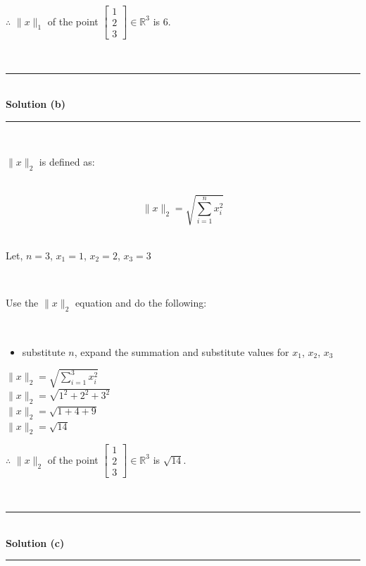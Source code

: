\documentclass{article}
\begin{document}
\parbox{\textwidth}{$\therefore$ $\|x\|_1$ of the point $\begin{bmatrix} 1 \\ 2 \\ 3 \end{bmatrix} \in \mathbb{R}^3$ is $6$.}\\

\noindent\rule{\textwidth}{0.4pt}\\

\textbf{Solution (b)}

\noindent\rule{\textwidth}{0.4pt}\\

\parbox{\textwidth}{$\|x\|_2$ is defined as:}\\

$$\|x\|_2 = \sqrt{\sum_{i=1}^{n} x_i^2}$$\\

\parbox{\textwidth}{Let, $n=3$, $x_1 = 1$, $x_2 = 2$, $x_3 = 3$}\\

\parbox{\textwidth}{Use the $\|x\|_2$ equation and do the following:}\\

\newpage

\begin{itemize}
    \item {substitute $n$, expand the summation and substitute values for $x_1$, $x_2$, $x_3$}
\end{itemize}

$\|x\|_2 = \sqrt{\sum_{i=1}^{3} x_i^2}$\\

$\|x\|_2 = \sqrt{1^2 + 2^2 + 3^2}$\\

$\|x\|_2 = \sqrt{1 + 4 + 9}$\\

$\|x\|_2 = \sqrt{14}$\\

\parbox{\textwidth}{$\therefore$ $\|x\|_2$ of the point $\begin{bmatrix} 1 \\ 2 \\ 3 \end{bmatrix} \in \mathbb{R}^3$  is $\sqrt{14}$.}\\

\noindent\rule{\textwidth}{0.4pt}\\

\textbf{Solution (c)}

\noindent\rule{\textwidth}{0.4pt}\\
\end{document}
